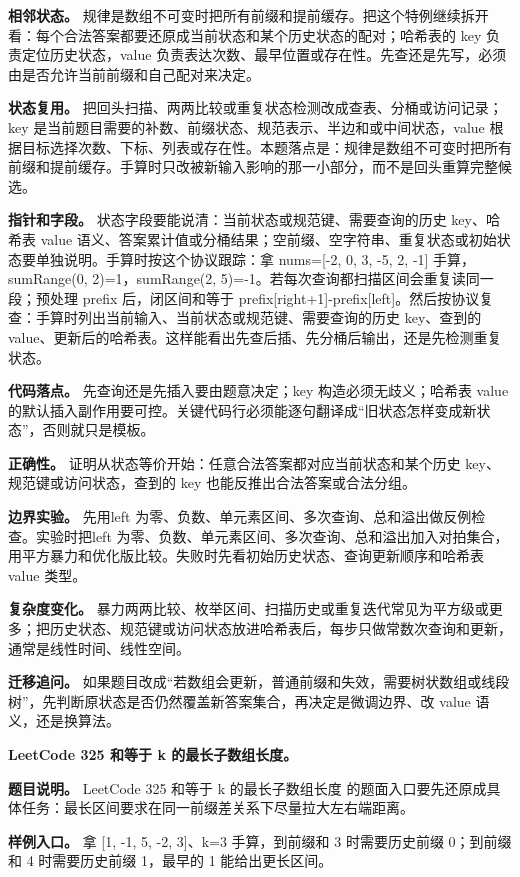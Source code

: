 \textbf{相邻状态。} 规律是数组不可变时把所有前缀和提前缓存。把这个特例继续拆开看：每个合法答案都要还原成当前状态和某个历史状态的配对；哈希表的 key 负责定位历史状态，value 负责表达次数、最早位置或存在性。先查还是先写，必须由是否允许当前前缀和自己配对来决定。

\textbf{状态复用。} 把回头扫描、两两比较或重复状态检测改成查表、分桶或访问记录；key 是当前题目需要的补数、前缀状态、规范表示、半边和或中间状态，value 根据目标选择次数、下标、列表或存在性。本题落点是：规律是数组不可变时把所有前缀和提前缓存。手算时只改被新输入影响的那一小部分，而不是回头重算完整候选。

\textbf{指针和字段。} 状态字段要能说清：当前状态或规范键、需要查询的历史 key、哈希表 value 语义、答案累计值或分桶结果；空前缀、空字符串、重复状态或初始状态要单独说明。手算时按这个协议跟踪：拿 nums=[-2, 0, 3, -5, 2, -1] 手算，sumRange(0, 2)=1，sumRange(2, 5)=-1。若每次查询都扫描区间会重复读同一段；预处理 prefix 后，闭区间和等于 prefix[right+1]-prefix[left]。然后按协议复查：手算时列出当前输入、当前状态或规范键、需要查询的历史 key、查到的 value、更新后的哈希表。这样能看出先查后插、先分桶后输出，还是先检测重复状态。

\textbf{代码落点。} 先查询还是先插入要由题意决定；key 构造必须无歧义；哈希表 value 的默认插入副作用要可控。关键代码行必须能逐句翻译成“旧状态怎样变成新状态”，否则就只是模板。

\textbf{正确性。} 证明从状态等价开始：任意合法答案都对应当前状态和某个历史 key、规范键或访问状态，查到的 key 也能反推出合法答案或合法分组。

\textbf{边界实验。} 先用left 为零、负数、单元素区间、多次查询、总和溢出做反例检查。实验时把left 为零、负数、单元素区间、多次查询、总和溢出加入对拍集合，用平方暴力和优化版比较。失败时先看初始历史状态、查询更新顺序和哈希表 value 类型。

\textbf{复杂度变化。} 暴力两两比较、枚举区间、扫描历史或重复迭代常见为平方级或更多；把历史状态、规范键或访问状态放进哈希表后，每步只做常数次查询和更新，通常是线性时间、线性空间。

\textbf{迁移追问。} 如果题目改成“若数组会更新，普通前缀和失效，需要树状数组或线段树”，先判断原状态是否仍然覆盖新答案集合，再决定是微调边界、改 value 语义，还是换算法。

\noindent\textbf{LeetCode 325 和等于 k 的最长子数组长度。}

\textbf{题目说明。} LeetCode 325 和等于 k 的最长子数组长度 的题面入口要先还原成具体任务：最长区间要求在同一前缀差关系下尽量拉大左右端距离。

\textbf{样例入口。} 拿 [1, -1, 5, -2, 3]、k=3 手算，到前缀和 3 时需要历史前缀 0；到前缀和 4 时需要历史前缀 1，最早的 1 能给出更长区间。

